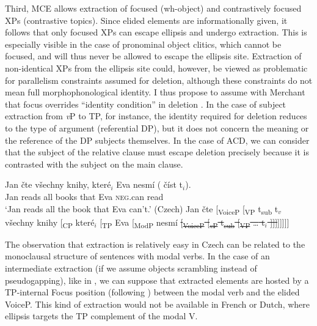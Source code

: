 \documentclass[output=paper,colorlinks,citecolor=brown,
modfonts
]{langscibook}
\begin{document}
Third, MCE allows extraction of focused (wh-object) and contrastively focused XPs (contrastive topics). Since elided elements are informationally given, it follows that only focused XPs can escape ellipsis and undergo extraction. This is especially visible in the case of pronominal object clitics, which cannot be focused, and will thus never be allowed to escape the ellipsis site. Extraction of non-identical XPs from the ellipsis site could, however, be viewed as problematic for parallelism constraints assumed for deletion, although these constraints do not mean full morphophonological identity. I thus propose to assume with Merchant that focus overrides ``identity condition'' in deletion \citep{Merchant2001}. In the case of subject extraction from \textit{v}P to TP, for instance, the identity required for deletion reduces to the type of argument (referential DP), but it does not concern the meaning or the reference of the DP subjects themselves. In the case of ACD, we can consider that the subject of the relative clause must escape deletion precisely because it is contrasted with the subject on the main clause.

\ea
\ea \label{33a}
\gll Jan čte všechny knihy, které$_{i}$ Eva nesmí (\hspace{-2pt} číst t$_{i}$). \\
Jan reads all  books that    Eva \textsc{neg}.can  {} read\\
\glt `Jan reads all the book that Eva can't.' \hfill (Czech)
\ex \label{33b}  Jan čte [\textsubscript{VoiceP} [\textsubscript{VP} t\textsubscript{sub} t$_{v}$ všechny knihy [\textsubscript{CP} které$_{i}$ [\textsubscript{TP} Eva [\textsubscript{ModP} nesmí \sout{[\textsubscript{VoiceP} [\textsubscript{\textit{v}P} t\textsubscript{sub} [\textsubscript{VP} {\ldots} t$_{i}$ ]]]}]]]]]  	
\z 
\z 

\noindent The observation that extraction is relatively easy in Czech can be related to the monoclausal structure of sentences with modal verbs. In the case of an intermediate extraction (if we assume objects scrambling instead of pseudogapping), like in , we can suppose that extracted elements are hosted by a TP-internal Focus position (following \citealt{belletti2004aspects}) between the modal verb and the elided VoiceP. This kind of extraction would not be available in French or Dutch, where ellipsis targets the TP complement of the modal V. 
\end{document}
